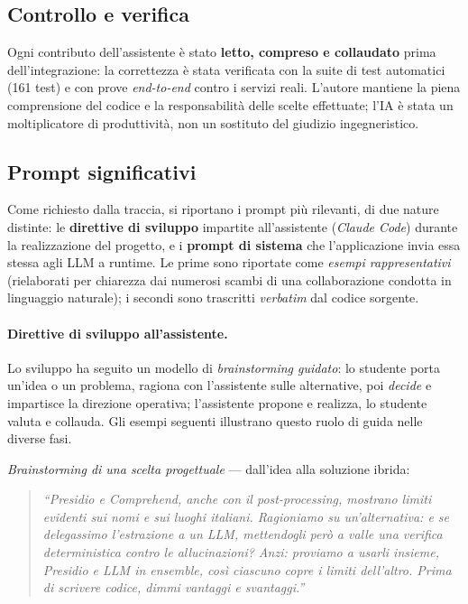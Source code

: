 \documentclass[11pt,a4paper]{article}
\begin{document}
\subsection{Controllo e verifica}
Ogni contributo dell'assistente è stato \textbf{letto, compreso e collaudato} prima
dell'integrazione: la correttezza è stata verificata con la suite di test automatici
(161 test) e con prove \emph{end-to-end} contro i servizi reali. L'autore mantiene la
piena comprensione del codice e la responsabilità delle scelte effettuate; l'IA è stata
un moltiplicatore di produttività, non un sostituto del giudizio ingegneristico.

\subsection{Prompt significativi}
\label{sec:prompt-usati}
Come richiesto dalla traccia, si riportano i prompt più rilevanti, di due nature distinte:
le \textbf{direttive di sviluppo} impartite all'assistente (\emph{Claude Code}) durante la
realizzazione del progetto, e i \textbf{prompt di sistema} che l'applicazione invia essa
stessa agli LLM a runtime. Le prime sono riportate come \emph{esempi rappresentativi}
(rielaborati per chiarezza dai numerosi scambi di una collaborazione condotta in linguaggio
naturale); i secondi sono trascritti \emph{verbatim} dal codice sorgente.

\paragraph{Direttive di sviluppo all'assistente.} Lo sviluppo ha seguito un modello di
\emph{brainstorming guidato}: lo studente porta un'idea o un problema, ragiona con
l'assistente sulle alternative, poi \emph{decide} e impartisce la direzione operativa;
l'assistente propone e realizza, lo studente valuta e collauda. Gli esempi seguenti
illustrano questo ruolo di guida nelle diverse fasi.

\emph{Brainstorming di una scelta progettuale} --- dall'idea alla soluzione ibrida:
\begin{quote}\small\itshape
``Presidio e Comprehend, anche con il post-processing, mostrano limiti evidenti sui nomi e
sui luoghi italiani. Ragioniamo su un'alternativa: e se delegassimo l'estrazione a un LLM,
mettendogli però a valle una verifica deterministica contro le allucinazioni? Anzi:
proviamo a usarli insieme, Presidio e LLM in \emph{ensemble}, così ciascuno copre i limiti
dell'altro. Prima di scrivere codice, dimmi vantaggi e svantaggi.''
\end{quote}
\end{document}
